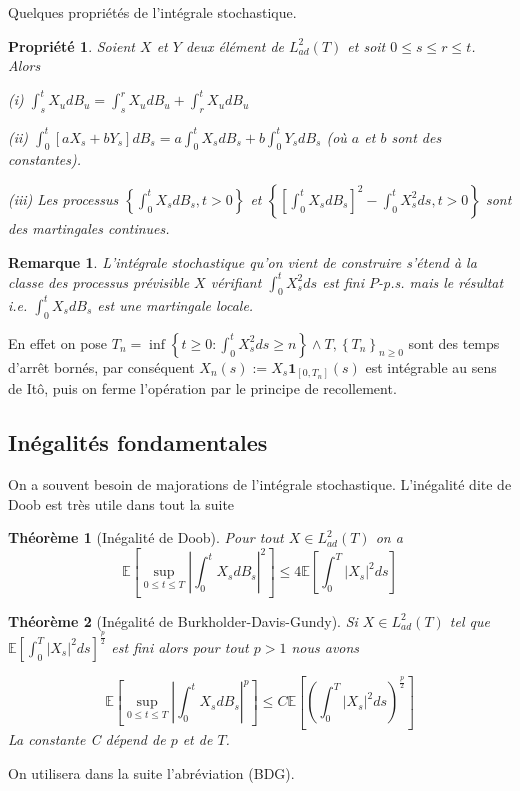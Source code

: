 \documentclass[A4paper,12pt]{report}
\newtheorem{theorem}{Th\'eor\`eme}[chapter]
\newtheorem{remark}{Remarque}[chapter]
\newtheorem{propr}{ Propriété}[chapter]
\newcommand{\E}{{\mathbb{E}}}
\begin{document}
Quelques propriétés de l'intégrale stochastique.
\begin{propr}
Soient $X$ et $Y$ deux élément de $L_{a d}^{2}(T)$ et soit $0 \leq s \leq r \leq t$. Alors

(i) $\int_{s}^{t} X_u d B_{u}=\int_{s}^{r} X_u d B_{u}+\int_{r}^{t} X_u d B_{u}$

(ii) $\int_{0}^{t}[a X_s+b Y_s] d B_{s}=a \int_{0}^{t} X_s d B_{s}+b \int_{0}^{t} Y_s d B_{s}$ (où $a$ et $b$ sont des constantes).


(iii) Les processus $\left\{\int_{0}^{t} X_s d B_{s}, t>0\right\}$ et $\left\{\left[\int_{0}^{t} X_s d B_{s}\right]^{2}-\int_{0}^{t} X_s ^{2} d s, t>0\right\}$ sont des martingales continues.

\end{propr}
\begin{remark} 
L'intégrale stochastique qu'on vient de construire s'étend à la classe des processus prévisible $X$ vérifiant $\int_{0}^{t} X_s ^{2} d s$ est fini $P$-p.s. mais le résultat i.e. $\int_{0}^{t} X_s d B_{s}$ est une martingale locale.
\end{remark}

En effet on pose $T_{n}=\inf \left\{t \geq 0: \int_{0}^{t} X_s ^{2} d s \geq n\right\} \wedge T,\left\{T_{n}\right\}_{n \geq 0}$ sont des temps d'arrêt bornés, par conséquent $X_{n}(s):=X_s \mathbf{1}_{\left[0, T_{n}\right]}(s)$ est intégrable au sens de Itô, puis on ferme l'opération par le principe de recollement.
\subsection{Inégalités fondamentales}
On a souvent besoin de majorations de l'intégrale stochastique. L'inégalité dite de Doob est très utile dans tout la suite
\begin{theorem}[Inégalité de Doob]
Pour tout $X \in L_{a d}^{2}(T)$ on a 
$$
\E\left[\sup _{0 \leq t \leq T}\left|\int_{0}^{t} X_s d B_{s}\right|^{2}\right] \leq 4 \E\left[\int_{0}^{T}|X_s|^{2} d s\right]
$$

\end{theorem}


\begin{theorem}[Inégalité de Burkholder-Davis-Gundy]
Si $X \in L_{a d}^{2}(T)$ tel que $\E\left[\int_{0}^{T}|X_s|^{2} d s\right]^{\frac{p}{2}}$ est fini alors pour tout $p>1$ nous avons

$$
\E\left[\sup _{0 \leq t \leq T}\left|\int_{0}^{t} X_s d B_{s}\right|^{p}\right] \leq C \E\left[\left(\int_{0}^{T}|X_s|^{2} d s\right)^{\frac{p}{2}}\right] 
$$
La constante C dépend de $p$ et de $T$.
\end{theorem}
On utilisera dans la suite l'abréviation (BDG).\\
\end{document}

